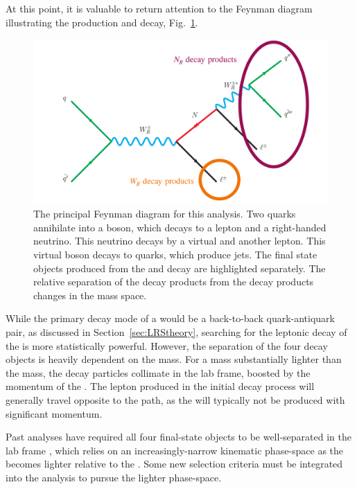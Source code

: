 At this point, it is valuable to return attention to the Feynman diagram illustrating the \WRNR production and decay, Fig.~\ref{fig:mainDiag2}.
\begin{figure}[!tp]
    \centering
    \includegraphics[width=\textwidth]{figures/labelledWRfeynman.pdf}
    \caption[
        \WR--object decay.
    ]{
      The principal Feynman diagram for this analysis.  Two quarks annihilate into a \WR boson, which decays to a lepton and a right-handed neutrino. This neutrino decays by a virtual \WR and another lepton.  This virtual boson decays to quarks, which produce jets. The final state objects produced from the \WR and \NR decay are highlighted separately. The relative separation of the \NR decay products from the \WR decay products changes in the \WRNR mass space.
    }
    \label{fig:mainDiag2}
\end{figure}
While the primary decay mode of a \WR would be a back-to-back quark-antiquark pair, as discussed in Section~\ref{sec:LRStheory}, searching for the leptonic decay of the \WR is more statistically powerful. However, the separation of the four decay objects is heavily dependent on the \NR mass. For a \NR mass substantially lighter than the \WR mass, the \NR decay particles collimate in the lab frame, boosted by the momentum of the \NR. The lepton produced in the initial \WR decay process will generally travel opposite to the \NR path, as the \WR will typically not be produced with significant momentum. 

Past analyses have required all four final-state objects to be well-separated in the lab frame \cite{EXO-17-011}, which relies on an increasingly-narrow kinematic phase-space as the \NR becomes lighter relative to the \WR. Some new selection criteria must be integrated into the analysis to pursue the lighter \NR phase-space. 

